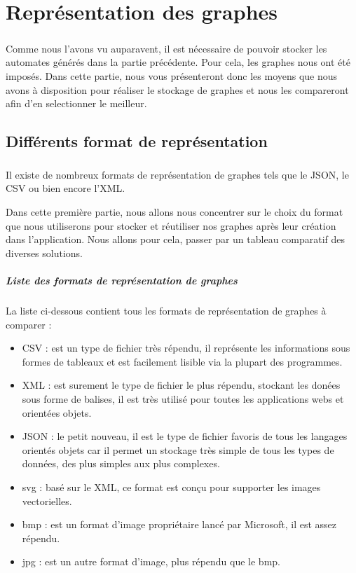 \chapter{Représentation des graphes}
\paragraph{}

Comme nous l'avons vu auparavent, il est nécessaire de pouvoir stocker les automates générés dans la partie précédente. Pour cela, les graphes nous ont été imposés. Dans cette partie, nous vous présenteront donc les moyens que nous avons à disposition pour réaliser le stockage de graphes et nous les compareront afin d'en selectionner le meilleur.

\section{Différents format de représentation}
  \paragraph{}
  Il existe de nombreux formats de représentation de graphes tels que le JSON, le CSV ou bien encore l'XML.
  
  Dans cette première partie, nous allons nous concentrer sur le choix du format que nous utiliserons pour stocker et réutiliser nos graphes après leur création dans l'application.
  Nous allons pour cela, passer par un tableau comparatif des diverses solutions.
  

  \paragraph{Liste des formats de représentation de graphes}
  La liste ci-dessous contient tous les formats de représentation de graphes à comparer : 
  \begin{itemize}
   \item CSV : est un type de fichier très répendu, il représente les informations sous formes de tableaux et est facilement lisible via la plupart des programmes. 
   \item XML : est surement le type de fichier le plus répendu, stockant les donées sous forme de balises, il est très utilisé pour toutes les applications webs et orientées objets. 
   \item JSON : le petit nouveau, il est le type de fichier favoris de tous les langages orientés objets car il permet un stockage très simple de tous les types de données, des plus simples aux plus complexes. 
   \item svg : basé sur le XML, ce format est conçu pour supporter les images vectorielles.
   \item bmp : est un format d'image propriétaire lancé par Microsoft, il est assez répendu.
   \item jpg : est un autre format d'image, plus répendu que le bmp.
  \end{itemize}


